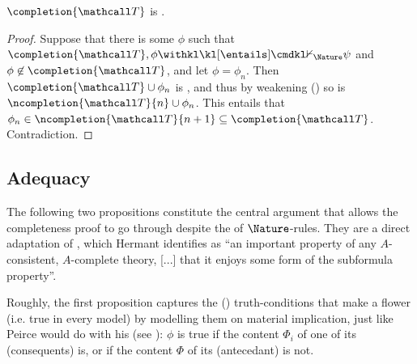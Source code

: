 \begin{scope}
\begin{lemma}
  $\completion{\tT}$ is \complete{\psi}.
\end{lemma}
\begin{proof}
  Suppose that there is some $\phi$ such that $\completion{\tT}, \phi
  \nentails{\Nature} \psi$ and $\phi \not\in \completion{\tT}$, and let $\phi =
  \phi_n$. Then $\completion{\tT} \cup \phi_n$ is \consistent{\psi}, and thus by
  weakening () so is $\ncompletion{\tT}{n} \cup \phi_n$. This
  entails that $\phi_n \in \ncompletion{\tT}{n+1} \subseteq \completion{\tT}$.
  Contradiction.
\end{proof}

\subsection{Adequacy}

The following two propositions constitute the central argument that allows the
completeness proof to go through despite the  of $\Nature$-rules.
They are a direct adaptation of \cite[Proposition 7]{hutchison_semantic_2005},
which Hermant identifies as ``an important property of any $A$-consistent,
$A$-complete theory, [...] that it enjoys some form of the subformula
property''.

Roughly, the first proposition captures the () truth-conditions
that make a flower \emph{} (i.e. true in every model) by modelling them on
material implication, just like Peirce would do with his  (see
): $\phi$ is true if the content $\Phi_i$ of one of its 
(consequents) is, or if the content $\Phi$ of its  (antecedant) is not.

\begin{proposition}
  

\end{proposition}
\end{scope}
